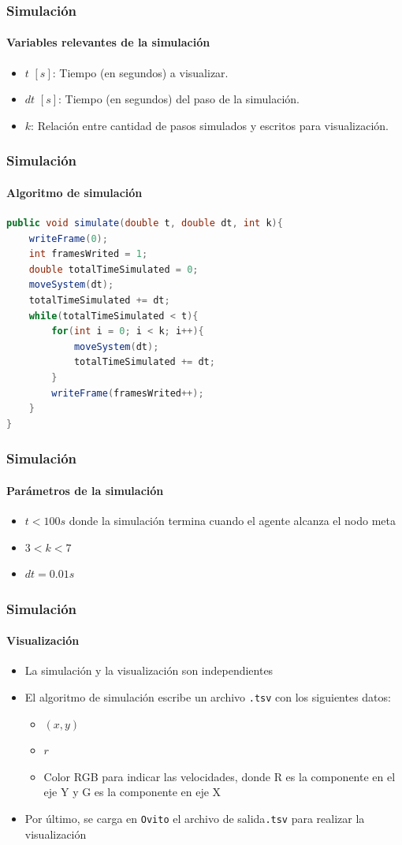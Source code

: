 \documentclass[hyperref={pdfpagelayout=SinglePage}]{beamer}
\begin{document}
\begin{frame}
\frametitle{Simulación}
\framesubtitle{Variables relevantes de la simulación}
\begin{itemize}
	\item $t$ $[s]$: Tiempo (en segundos) a visualizar.
	\item $dt$ $[s]$: Tiempo (en segundos) del paso de la simulación.
	\item $k$: Relación entre cantidad de pasos simulados y escritos para visualización.
\end{itemize}
\end{frame}

\begin{frame}[fragile]
\frametitle{Simulación}
\framesubtitle{Algoritmo de simulación}
\begin{lstlisting}[language=Java, caption = Algoritmo de simulación]
public void simulate(double t, double dt, int k){
	writeFrame(0);
	int framesWrited = 1;
	double totalTimeSimulated = 0;
	moveSystem(dt);
	totalTimeSimulated += dt;
	while(totalTimeSimulated < t){
		for(int i = 0; i < k; i++){
			moveSystem(dt);
			totalTimeSimulated += dt;
		}
		writeFrame(framesWrited++);
	}
}
\end{lstlisting}
\end{frame}

\begin{frame}
\frametitle{Simulación}
\framesubtitle{Parámetros de la simulación}
	\begin{itemize}
		\item $t < 100 s$ donde la simulación termina cuando el agente alcanza el nodo meta
		\item $3 < k < 7$
		\item $dt = 0.01 s$
	\end{itemize}
\end{frame}

\begin{frame}
\frametitle{Simulación}
\framesubtitle{Visualización}
\begin{itemize}
	\item La simulación y la visualización son independientes
	\item El algoritmo de simulación escribe un archivo \texttt{.tsv} con los siguientes datos:
	\begin{itemize}
		\item $(x,y)$
		\item $r$
		\item Color RGB para indicar las velocidades, donde R es la componente en el eje Y y G es la componente en eje X
	\end{itemize}
	\item Por último, se carga en \texttt{Ovito} el archivo de salida\texttt{.tsv} para realizar la visualización
\end{itemize}
\end{frame}
\end{document}

